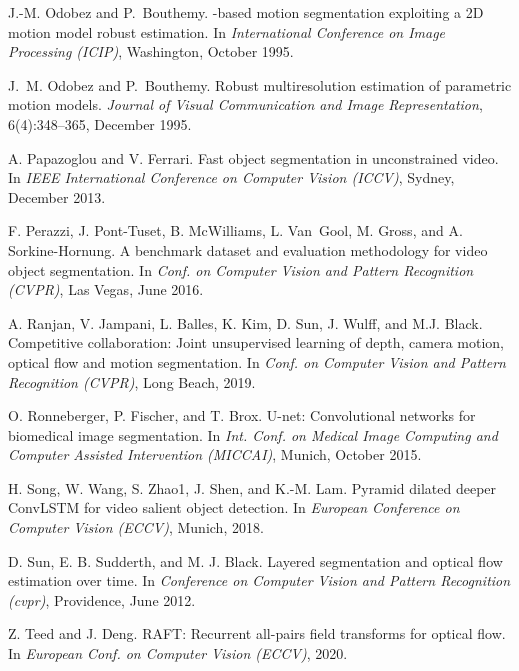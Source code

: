 \documentclass[10pt,twocolumn,letterpaper]{article}
\begin{document}
\begin{thebibliography}{28}
J.-M. Odobez and P.~Bouthemy.
-{{based}} motion segmentation exploiting a {{2D}} motion model robust estimation.
\newblock In \emph{International Conference on Image Processing (ICIP)},
Washington, October 1995.


J.~M. Odobez and P.~Bouthemy.
\newblock Robust multiresolution estimation of parametric motion models.
\newblock \emph{Journal of Visual Communication and Image Representation}, 6(4):348--365, December 1995.




A. Papazoglou and V. Ferrari.
\newblock Fast object segmentation in unconstrained video.
\newblock In \emph{IEEE International Conference on Computer Vision (ICCV)}, Sydney, December 2013.




F. Perazzi, J. Pont-Tuset, B. McWilliams, L. Van~Gool, M. Gross, and A. Sorkine-Hornung.
\newblock A benchmark dataset and evaluation methodology for video object segmentation.
\newblock In \emph{Conf. on Computer Vision and Pattern Recognition (CVPR)}, Las Vegas, June 2016.


A. Ranjan, V. Jampani, L. Balles, K. Kim, D. Sun, J. Wulff, and M.J. Black.
\newblock Competitive collaboration: Joint unsupervised learning of depth, camera motion, optical flow and motion segmentation.
\newblock In \emph{Conf. on Computer Vision and Pattern Recognition (CVPR)}, Long Beach, 2019.

O. Ronneberger, P. Fischer, and T. Brox.
\newblock U-net: Convolutional networks for biomedical image segmentation.
\newblock In \emph{Int. Conf. on Medical Image Computing and Computer Assisted Intervention (MICCAI)}, Munich, October 2015.

H. Song, W. Wang, S. Zhao1, J. Shen, and K.-M. Lam.
\newblock Pyramid dilated deeper ConvLSTM for video salient object detection.
\newblock In
\emph{European Conference on Computer Vision (ECCV)},
Munich, 2018.


D. Sun, E. B. Sudderth, and M. J. Black.
\newblock Layered segmentation and optical flow estimation over time.
\newblock In \emph{Conference on Computer Vision and Pattern Recognition (cvpr)}, Providence, June 2012. 

Z. Teed and J. Deng.
\newblock RAFT: Recurrent all-pairs field transforms for optical flow.
\newblock In \emph{European Conf. on Computer Vision (ECCV)}, 2020.


\end{thebibliography}
\end{document}
